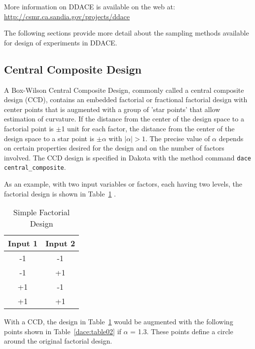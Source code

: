More information on DDACE is available on the web at:
\url{http://csmr.ca.sandia.gov/projects/ddace}

The following sections provide more detail about the sampling 
methods available for design of experiments in DDACE. 

\subsection{Central Composite Design}\label{dace:ccd}

A Box-Wilson Central Composite Design, commonly called a central
composite design (CCD), contains an embedded factorial or fractional
factorial design with center points that is augmented with a group of
'star points' that allow estimation of curvature.  If the distance
from the center of the design space to a factorial point is $\pm$1
unit for each factor, the distance from the center of the design space
to a star point is $\pm\alpha$ with $\mid\alpha\mid > 1$. The precise
value of $\alpha$ depends on certain properties desired for the design and on
the number of factors involved.  The CCD design is specified in Dakota
with the method command \texttt{dace central\_composite}.

As an example, with two input variables or factors, each having two 
levels, the factorial design is shown in Table~\ref{dace:table01} . 

\begin{table}[ht]
 \caption{Simple Factorial Design}
 \label{dace:table01}	
 \begin{center}
  \begin{tabular}{c|c}
  \hline
  Input 1            & Input 2         \\ \hline \hline 
  -1                 & -1             \\ \hline 
  -1                 & +1           \\ \hline
  +1                 & -1      \\ \hline
  +1                 & +1        \\ \hline
  \end{tabular}
\end{center}
\end{table}


With a CCD, the design in Table~\ref{dace:table01} would be augmented 
with the following points shown in Table~\ref{dace:table02} 
if $\alpha$ = 1.3. These points define a circle around the original  
factorial design.

